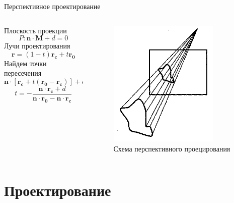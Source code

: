 \documentclass{beamer}
\begin{document}
	\begin{frame}{Перспективное проектирование}

		\begin{columns}
			\begin{column}{0.5\textwidth}
			Плоскость проекции
			\[
				P: \bm{n} \cdot \bm{M} + d = 0	
			\]
			Лучи проектирования
			\[
				\bm{r} = (1-t) \bm{r_c} + t \bm{r_0}	
			\]
			Найдем точки пересечения
			\[
				\bm{n} \cdot [\bm{r_c} +t (\bm{r_0} - \bm{r_c}) ] + d = 0	
			\]
			\[
				t = -
				\frac{\bm{n} \cdot \bm{r_c} + d}{\bm{n} \cdot \bm{r_0} - \bm{n} \cdot \bm{r_c} }
			\]
			\end{column}
			\begin{column}{0.5\textwidth}
				\begin{figure} 
						\includegraphics[width=0.8\textwidth]{images/perspective_projection.png}
					\caption{Схема перспективного проецирования}
				\end{figure}
			\end{column}
		\end{columns}
	\end{frame}

	\section{Проектирование}
\end{document}

